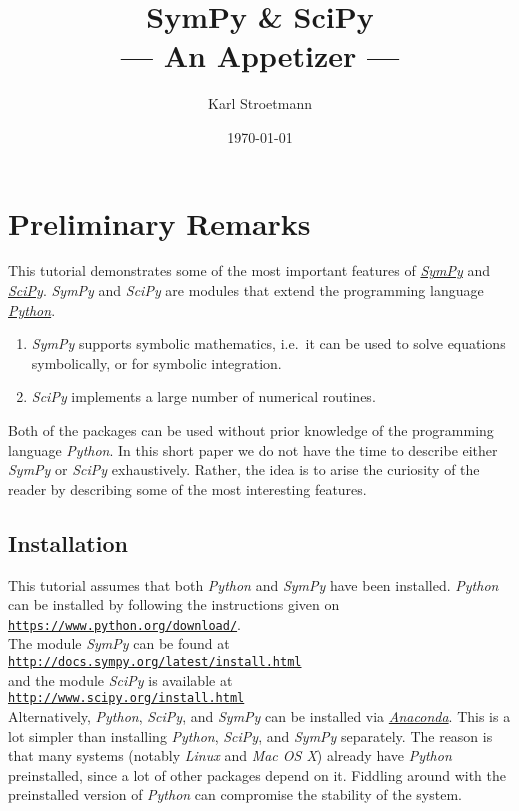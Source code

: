 \documentclass{report}
\title{SymPy \& SciPy \\[0.3cm]
      --- An Appetizer --- }
\author{Karl Stroetmann}
\date{\today}
\begin{document}
\maketitle
\tableofcontents

\chapter{Preliminary Remarks}
This tutorial demonstrates some of the most important features of \href{http://sympy.org/en/index.html}{\textsl{SymPy}}
and \href{http://www.scipy.org}{\textsl{SciPy}}.  \textsl{SymPy} and \textsl{SciPy} are modules that extend the
programming language \href{http://www.python.org}{\textsl{Python}}.  
\begin{enumerate}
\item \textsl{SymPy} supports symbolic mathematics, i.e.~it can be used to solve equations symbolically, or for symbolic
      integration. 
\item \textsl{SciPy} implements a large number of numerical routines.
\end{enumerate}
Both of the packages can be used without prior knowledge of the programming language \textsl{Python}.
In this short paper we do not have the time to describe either \textsl{SymPy} or \textsl{SciPy} exhaustively.  Rather,
the idea is to arise the curiosity of the reader by describing some of the most interesting features.

\section{Installation}
This tutorial assumes that both \textsl{Python} and
\textsl{SymPy} have been installed.  \textsl{Python} can be installed  by following the instructions given on  
\\[0.2cm]
\hspace*{1.3cm}
\href{https://www.python.org/download/}{\texttt{https://www.python.org/download/}}.
\\[0.2cm]
The module \textsl{SymPy} can be found at
\\[0.2cm]
\hspace*{1.3cm}
\href{http://docs.sympy.org/latest/install.html}{\texttt{http://docs.sympy.org/latest/install.html}}
\\[0.2cm]
and the module \textsl{SciPy} is available at
\\[0.2cm]
\hspace*{1.3cm}
\href{http://www.scipy.org/install.html}{\texttt{http://www.scipy.org/install.html}}
\\[0.2cm]
Alternatively, \textsl{Python}, \textsl{SciPy}, and \textsl{SymPy} can be installed via 
\href{https://store.continuum.io/cshop/anaconda/}{\emph{Anaconda}}.  This is a lot simpler than installing
\textsl{Python}, \textsl{SciPy}, and \textsl{SymPy} separately.  The reason is that many systems (notably \textsl{Linux}
and \textsl{Mac OS X})  already have \textsl{Python} preinstalled, since a lot of other packages depend
on it.  Fiddling around with the preinstalled version of \textsl{Python} can compromise the
stability of the system.
\end{document}
